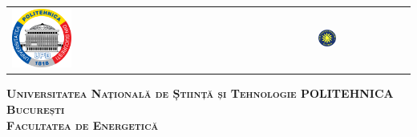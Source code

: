 



\begin{titlepage}
	\centering
	\begin{tabular}{p{6cm}p{3.3cm}}
		\includegraphics[width=0.2\textwidth]{img/upb.png} &
		\includegraphics[width=0.2\textwidth]{img/fe.png}
	\end{tabular}
	\vspace{1cm}

	{\scshape\Large \textbf{Universitatea Națională de Știință și Tehnologie POLITEHNICA București} \\}
	{\scshape\Large \textbf{Facultatea de Energetică} \\}
	
\end{titlepage}

